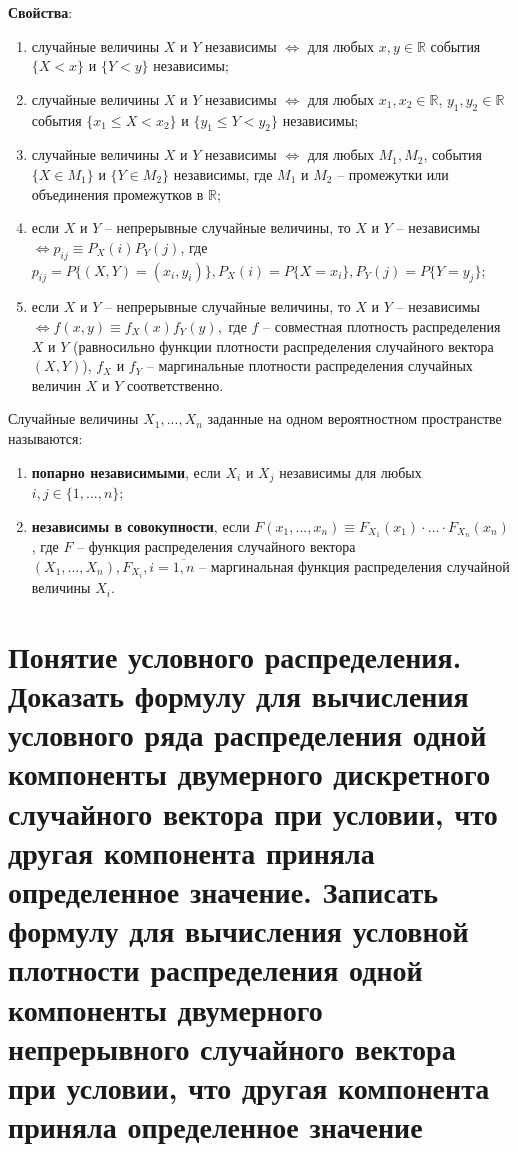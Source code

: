 \textbf{Свойства}:
\begin{enumerate}
	\item случайные величины $X$ и $Y$ независимы $\iff$ для любых $x, y \in \mathbb{R}$ события $\{X < x\}$ и $\{Y < y\}$ независимы;
	\item случайные величины $X$ и $Y$ независимы $\iff$ для любых $x_1, x_2 \in \mathbb{R}$, $y_1, y_2 \in \mathbb{R}$ события $\{x_1 \leq X < x_2\}$ и $\{y_1 \leq Y < y_2\}$ независимы;
	\item случайные величины $X$ и $Y$ независимы $\iff$ для любых $M_1, M_2$, события $\{X \in M_1\}$ и $\{Y \in M_2\}$ независимы, где $M_1$ и $M_2$ -- промежутки или объединения промежутков в $\mathbb{R}$;
	\item если $X$ и $Y$ -- непрерывные случайные величины, то $X$ и $Y$ -- независимы $\iff p_{ij} \equiv P_X(i)P_Y(j)$, где $p_{ij} = P\{(X, Y) = (x_i, y_i)\}, P_X(i) = P\{X = x_i\}, P_Y(j) = P\{Y = y_j\}$;
	\item если $X$ и $Y$ -- непрерывные случайные величины, то $X$ и $Y$ -- независимы $\iff f(x, y) \equiv f_X(x)f_Y(y),$ где $f$ -- совместная плотность распределения $X$ и $Y$ (равносильно функции плотности распределения случайного вектора $(X, Y)$), $f_X$ и $f_Y$ -- маргинальные плотности распределения случайных величин $X$ и $Y$ соответственно.
\end{enumerate}

Случайные величины $X_1, ..., X_n$ заданные на одном вероятностном пространстве называются:
\begin{enumerate}
	\item \textbf{попарно независимыми}, если $X_i$ и $X_j$ независимы для любых $i, j \in \{1, ..., n\}$;
	\item \textbf{независимы в совокупности}, если $F(x_1, ..., x_n) \equiv F_{X_1}(x_1) \cdot ... \cdot F_{X_n}(x_n)$, где $F$ -- функция распределения случайного вектора $(X_1, ..., X_n), F_{X_i},  i = \overline{1, n}$ -- маргинальная функция распределения случайной величины $X_i$.
\end{enumerate}

\section{Понятие условного распределения. Доказать формулу для вычисления условного ряда распределения одной компоненты двумерного дискретного случайного вектора при условии, что другая компонента приняла определенное значение. Записать формулу для вычисления условной плотности распределения одной компоненты двумерного непрерывного случайного вектора при условии, что другая компонента приняла определенное значение}

